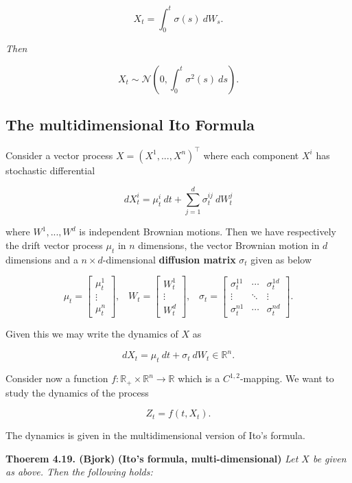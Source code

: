 \documentclass[
]{book}
\begin{document}
\[
X_t=\int_0^t \sigma(s)\ dW_s.\tag{4.37}
\]

\emph{Then}

\[
X_t\sim\mathcal{N}\left(0,\int_0^t\sigma^2(s)\ ds\right).
\]

\hypertarget{the-multidimensional-ito-formula}{%
\subsection{The multidimensional Ito Formula}\label{the-multidimensional-ito-formula}}

Consider a vector process \(X=(X^1,...,X^n)^\top\) where each component \(X^i\) has stochastic differential

\[
d X_t^i=\mu_t^i\ dt+\sum_{j=1}^d\sigma^{ij}_t\ dW_t^j
\]

where \(W^1,...,W^d\) is independent Brownian motions. Then we have respectively the drift vector process \(\mu_t\) in \(n\) dimensions, the vector Brownian motion in \(d\) dimensions and a \(n\times d\)-dimensional \textbf{diffusion matrix} \(\sigma_t\) given as below

\[
\mu_t=\begin{bmatrix}\mu^1_t\\ \vdots\\ \mu^n_t\end{bmatrix},\hspace{10pt}W_t=\begin{bmatrix}W^1_t\\ \vdots\\ W^d_t\end{bmatrix},\hspace{10pt}\sigma_t=\begin{bmatrix}\sigma^{11}_t & \cdots & \sigma^{1d}_t \\ \vdots & \ddots & \vdots\\ \sigma^{n1}_t &\cdots& \sigma^{nd}_t\end{bmatrix}.
\]

Given this we may write the dynamics of \(X\) as

\[
d X_t=\mu_t\ dt+\sigma_t\ dW_t\in\mathbb{R}^n.
\]

Consider now a function \(f:\mathbb{R}_+\times \mathbb{R}^n\to\mathbb{R}\) which is a \(C^{1,2}\)-mapping. We want to study the dynamics of the process

\[
Z_t=f(t,X_t).
\]

The dynamics is given in the multidimensional version of Ito's formula.

\textbf{Thoerem 4.19. (Bjork)} \textbf{(Ito's formula, multi-dimensional)} \emph{Let \(X\) be given as above. Then the following holds:}
\end{document}
